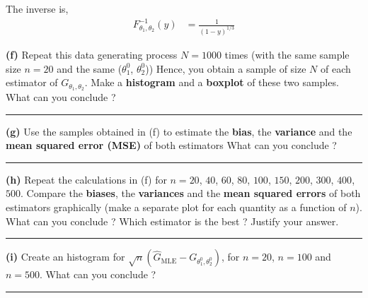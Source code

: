 \documentclass[10pt, a4paper, nofootinbib]{scrartcl}
\begin{document}
The inverse is, 
\begin{align*}
  F^{-1}_{\theta_1, \theta_2}(y) 
    &= \frac{1}{(1-y)^{1/3}}
\end{align*}

\textbf{(f)} Repeat this data generating process $N = 1000$ times (with the same sample size $n = 20$ and the same ($\theta_1^0$, $\theta_2^0$)) Hence, you obtain a sample of size $N$ of each estimator of $G_{\theta_1, \theta_2}$. Make a \textbf{histogram} and a \textbf{boxplot} of these two samples. What can you conclude ?

\begin{center}\rule{6cm}{0.4pt}\end{center}


\textbf{(g)} Use the samples obtained in (f) to estimate the \textbf{bias}, the \textbf{variance} and the \textbf{mean squared error (MSE)} of both estimators What can you conclude ?

\begin{center}\rule{6cm}{0.4pt}\end{center}

\textbf{(h)} Repeat the calculations in (f) for $n = 20$, $40$, $60$, $80$, $100$, $150$, $200$, $300$, $400$, $500$. Compare the \textbf{biases}, the \textbf{variances} and the \textbf{mean squared errors} of both estimators graphically (make a separate plot for each quantity as a function of $n$). What can you conclude ? Which estimator is the best ? Justify your answer.

\begin{center}\rule{6cm}{0.4pt}\end{center}

\textbf{(i)} Create an histogram for $\sqrt{n}(\hat{G}_{\text{MLE}} - G_{\theta_1^0, \theta_2^0} )$, for $n = 20$, $n = 100$ and $n = 500$. What can you conclude ?

\begin{center}\rule{6cm}{0.4pt}\end{center}
\end{document}
